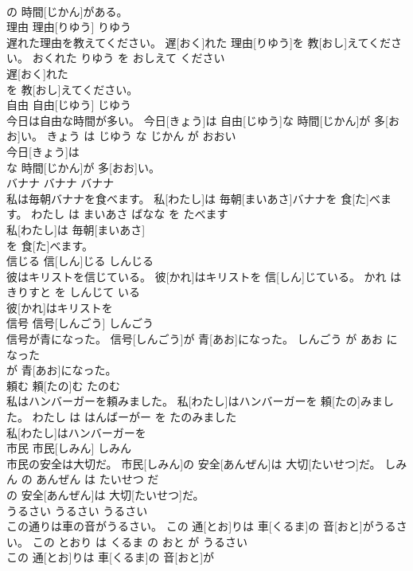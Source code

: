 \documentclass[8pt]{extreport}
\begin{document}
\begin{CJK}{UTF8}{min}
\\	の 時間[じかん]がある。			
\\	理由	理由[りゆう]	りゆう	
\\	遅れた理由を教えてください。	遅[おく]れた 理由[りゆう]を 教[おし]えてください。	おくれた りゆう を おしえて ください	
\\	遅[おく]れた
\\	を 教[おし]えてください。			
\\	自由	自由[じゆう]	じゆう	
\\	今日は自由な時間が多い。	今日[きょう]は 自由[じゆう]な 時間[じかん]が 多[おお]い。	きょう は じゆう な じかん が おおい	
\\	今日[きょう]は
\\	な 時間[じかん]が 多[おお]い。			
\\	バナナ	バナナ	バナナ	
\\	私は毎朝バナナを食べます。	私[わたし]は 毎朝[まいあさ]バナナを 食[た]べます。	わたし は まいあさ ばなな を たべます	
\\	私[わたし]は 毎朝[まいあさ]
\\	を 食[た]べます。			
\\	信じる	信[しん]じる	しんじる	
\\	彼はキリストを信じている。	彼[かれ]はキリストを 信[しん]じている。	かれ は きりすと を しんじて いる	
\\	彼[かれ]はキリストを
\\	信号	信号[しんごう]	しんごう	
\\	信号が青になった。	信号[しんごう]が 青[あお]になった。	しんごう が あお に なった	
\\	が 青[あお]になった。			
\\	頼む	頼[たの]む	たのむ	
\\	私はハンバーガーを頼みました。	私[わたし]はハンバーガーを 頼[たの]みました。	わたし は はんばーがー を たのみました	
\\	私[わたし]はハンバーガーを
\\	市民	市民[しみん]	しみん	
\\	市民の安全は大切だ。	市民[しみん]の 安全[あんぜん]は 大切[たいせつ]だ。	しみん の あんぜん は たいせつ だ	
\\	の 安全[あんぜん]は 大切[たいせつ]だ。			
\\	うるさい	うるさい	うるさい	
\\	この通りは車の音がうるさい。	この 通[とお]りは 車[くるま]の 音[おと]がうるさい。	この とおり は くるま の おと が うるさい	
\\	この 通[とお]りは 車[くるま]の 音[おと]が

\end{CJK}
\end{document}
